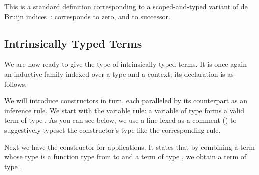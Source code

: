 \documentclass{article}
\begin{document}
\noindent
\begin{minipage}{.5\textwidth}
\end{minipage}\hfill
\begin{minipage}{.45\textwidth}
\end{minipage}

This is a standard definition
corresponding to a scoped-and-typed variant of de Bruijn
indices~\cite{de1972lambda}:
 corresponds to zero, and  to successor.

\subsection{Intrinsically Typed Terms}

We are now ready to give the type of intrinsically typed terms.
It is once again an inductive family indexed over a type and a
context; its declaration is as follows.


We will introduce constructors in turn, each paralleled by its
counterpart as an inference rule.
%
We start with the variable rule: a variable of type 
forms a valid term of type .
%
As you can see below, we use a line lexed as a comment (\AC{---})
to suggestively typeset the constructor's type like the
corresponding rule.

\noindent
\begin{minipage}[t]{.5\textwidth}
\end{minipage}\hfill
\begin{minipage}[t]{.35\textwidth}
\begin{mathpar}
\end{mathpar}
\end{minipage}

Next we have the constructor for applications. It states that
by combining a term whose type is a function type from  to 
and a term of type , we obtain a term of type .

\noindent
\begin{minipage}[t]{.5\textwidth}
\end{minipage}\hfill
\begin{minipage}[t]{.35\textwidth}
\begin{mathpar}
\end{mathpar}
\end{minipage}
\end{document}
